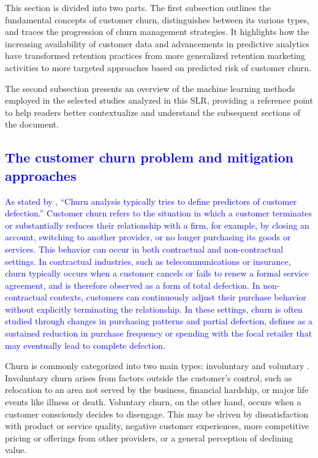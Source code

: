 \documentclass[preprint,12pt]{elsarticle}
\newcommand{\DD}[2]{\textcolor{blue}{#1}[\textcolor{red}{#2}]}
\begin{document}

This section is divided into two parts. The first subsection outlines the fundamental concepts of customer churn, distinguishes between its various types, and traces the progression of churn management strategies. It highlights how the increasing availability of customer data and advancements in predictive analytics have transformed retention practices from more generalized retention marketing activities to more targeted approaches based on predicted risk of customer churn.

The second subsection presents an overview of the machine learning methods employed in the selected studies analyzed in this SLR, providing a reference point to help readers better contextualize and understand the subsequent sections of the document.
 
\subsection{\textcolor{blue}{The customer churn problem and mitigation approaches}}

\textcolor{blue}{As stated by \cite{S37-ID826-Buckinx}, ``Churn analysis typically tries to define predictors of customer defection.'' Customer churn refers to the situation in which a customer terminates or substantially reduces their relationship with a firm, for example, by closing an account, switching to another provider, or no longer purchasing its goods or services. This behavior can occur in both contractual and non-contractual settings. In contractual industries, such as telecommunications or insurance, churn typically occurs when a customer cancels or fails to renew a formal service agreement, and is therefore observed as a form of total defection. In non-contractual contexts, customers can continuously adjust their purchase behavior without explicitly terminating the relationship. In these settings, churn is often studied through changes in purchasing patterns and partial defection, defines as a sustained reduction in purchase frequency or spending with the focal retailer that may eventually lead to complete defection.}


Churn is commonly categorized into two main types: involuntary and voluntary \cite{park2022not}. Involuntary churn arises from factors outside the customer’s control, such as relocation to an area not served by the business, financial hardship, or major life events like illness or death. Voluntary churn, on the other hand, occurs when a customer consciously decides to disengage. This may be driven by dissatisfaction with product or service quality, negative customer experiences, more competitive pricing or offerings from other providers, or a general perception of declining value.
\end{document}
